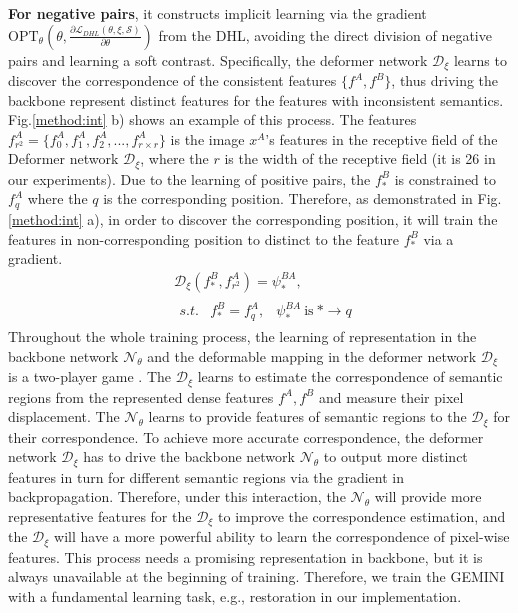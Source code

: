 \textbf{For negative pairs}, it constructs implicit learning via the gradient $\text{OPT}_{\theta}(\theta,\frac{\partial\mathcal{L}_{DHL}(\theta,\xi,\mathcal{S})}{\partial \theta})$ from the DHL, avoiding the direct division of negative pairs and learning a soft contrast. Specifically, the deformer network $\mathcal{D}_{\xi}$ learns to discover the correspondence of the consistent features $\{f^{A},f^{B}\}$, thus driving the backbone represent distinct features for the features with inconsistent semantics. Fig.\ref{method:int} b) shows an example of this process. The features $f^{A}_{r^{2}}=\{f^{A}_{0},f^{A}_{1},f^{A}_{2},...,f^{A}_{r\times r}\}$ is the image $x^{A}$'s features in the receptive field of the Deformer network $\mathcal{D}_{\xi}$, where the $r$ is the width of the receptive field (it is 26 in our experiments). Due to the learning of positive pairs, the $f^{B}_{*}$ is constrained to $f^{A}_{q}$ where the $q$ is the corresponding position. Therefore, as demonstrated in Fig.\ref{method:int} a), in order to discover the corresponding position, it will train the features in non-corresponding position to distinct to the feature $f^{B}_{*}$ via a gradient.
\begin{equation}\label{equ:nega}
\begin{aligned}
&\mathcal{D}_{\xi}(f^{B}_{*},f^{A}_{r^2})=\psi^{BA}_{*},\\
&\begin{array}{lll}
s.t. & f^{B}_{*}=f^{A}_{q},&\psi^{BA}_{*}\ \text{is}\ *\rightarrow q
\end{array}
\end{aligned}
\end{equation}
Throughout the whole training process, the learning of representation in the backbone network $\mathcal{N}_{\theta}$ and the deformable mapping in the deformer network $\mathcal{D}_{\xi}$ is a two-player game \cite{saad2009coalitional}. The $\mathcal{D}_{\xi}$ learns to estimate the correspondence of semantic regions from the represented dense features $f^{A},f^{B}$ and measure their pixel displacement. The $\mathcal{N}_{\theta}$ learns to provide features of semantic regions to the $\mathcal{D}_{\xi}$ for their correspondence. To achieve more accurate correspondence, the deformer network $\mathcal{D}_{\xi}$ has to drive the backbone network $\mathcal{N}_{\theta}$ to output more distinct features in turn for different semantic regions via the gradient in backpropagation. Therefore, under this interaction, the $\mathcal{N}_{\theta}$ will provide more representative features for the $\mathcal{D}_{\xi}$ to improve the correspondence estimation, and the $\mathcal{D}_{\xi}$ will have a more powerful ability to learn the correspondence of pixel-wise features. This process needs a promising representation in backbone, but it is always unavailable at the beginning of training. Therefore, we train the GEMINI with a fundamental learning task, e.g., restoration \cite{zhou2019models,pathak2016context} in our implementation. 